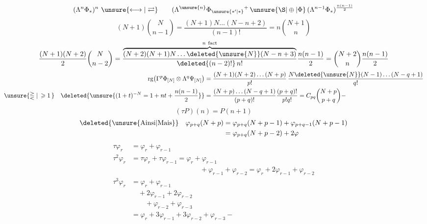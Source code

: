 \[
(\Lambda^n\Phi_*)^n\ \unsure{\longleftrightarrow|\rightleftarrows}\qquad
(\Lambda^{\unsure{n}}\Phi_{\unsure{*'|*}}{}^{+}\,\unsure{\S|\oplus|\Phi}\,(\Lambda^{n-1}\Phi_*)^{\frac{n(n-1)}{2}}
\]
\[
(N+1)\binom N{n-1}=\frac{(N+1)N\ldots(N-n+2)}{(n-1)!}=n\binom{N+1}n
\]
\[
\frac{(N+1)(N+2)}{2}\binom{N}{n-2}
=\frac{\overbrace{(N+2)(N+1)N\ldots\deleted{\unsure{N}}(N-n+3)}^{n\ \text{fact}}}{\deleted{(n-2)!}\,n!}\frac{n(n-1)}2
=\binom{N+2}{n}\frac{n(n-1)}2
\]
\[
\begin{aligned}
\operatorname{rg}\bigl(\Gamma^p\Phi_{[N]}\otimes\Lambda^q\Psi_{[N]}\bigr)
&=\frac{(N+1)(N+2)\ldots(N+p)}{p!}\,\frac{N\deleted{\unsure{N}}(N-1)\ldots(N-q+1)}{q!}\\
\unsure{\gtreqless|\,\geqslant1\,}\quad
\deleted{\unsure{(1+t)^{-N}=1+nt+\frac{n(n-1)}2}}&=\frac{(N+p)\ldots(N-q+1)}{(p+q)!}\frac{(p+q)!}{p!q!}=C_{pq}\binom{N+p}{p+q}-
\end{aligned}
\]
\[
(\tau P)(n)=P(n+1)
\]
\[
\begin{aligned}
\deleted{\unsure{\text{Ainsi}|\text{Mais}}}\quad\varphi_{p+q}(N+p)&=\varphi_{p+q}(N+p-1)+\varphi_{p+q-1}(N+p-1)\\
&=\varphi_{p+q}(N+p-2)+2\varphi
\end{aligned}
\]
\[
\begin{aligned}
\tau\varphi_r&=\varphi_r+\varphi_{r-1}\\
\tau^2\varphi_r&=\tau\varphi_r+\tau\varphi_{r-1}=\varphi_r+\varphi_{r-1}\\
&\hspace{10em}+\varphi_{r-1}+\varphi_{r-2}
=\varphi_r+2\varphi_{r-1}+\varphi_{r-2}\\
\tau^3\varphi_r&=\varphi_r+\varphi_{r-1}\\
&\quad+2\varphi_{r-1}+2\varphi_{r-2}\\
&\qquad+\varphi_{r-2}+\varphi_{r-3}\\
&=\varphi_r+3\varphi_{r-1}+3\varphi_{r-2}+\varphi_{r-3}-
\end{aligned}
\]
